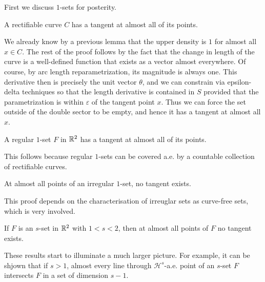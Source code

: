 \documentclass{memoir}
\begin{document}
First we discuss \(1\)-sets for posterity.
\begin{prop}
	A rectifiable curve \(C\) has a tangent at almost all of its points.
\end{prop}
We already know by a previous lemma that the upper density is \(1\) for almost all \(x \in C\). The rest of the proof follows by the fact that the change in length of the curve is a well-defined function that exists as a vector almost everywhere. Of course, by arc length reparametrization, its magnitude is always one. This derivative then is precisely the unit vector \(\theta \), and we can constrain via epsilon-delta techniques so that the length derivative is contained in \(S\) provided that the parametrization is within \(\varepsilon\) of the tangent point \(x\). Thus we can force the set outside of the double sector to be empty, and hence it has a tangent at almost all \(x\). %

\begin{prop}
	A regular \(1\)-set \(F\) in \(\mathbb{R}^2\) has a tangent at almost all of its points.
\end{prop}
This follows because regular \(1\)-sets can be covered a.e. by a countable collection of rectifiable curves.

 \begin{prop}
	At almost all points of an irregular \(1\)-set, no tangent exists.
\end{prop}
This proof depends on the characterisation of irreuglar sets as curve-free sets, which is very involved.

\begin{prop}
	If \(F\) is an \(s\)-set in \(\mathbb{R}^2\) with \(1<s<2\), then at almost all points of \(F\) no tangent exists.
\end{prop}

These results start to illuminate a much larger picture. For example, it can be shjown that if \(s>1\), almost every line through \(\mathcal{H}^{s}\)-a.e. point of an \(s\)-set \(F\) intersects \(F\) in a set of dimension \(s-1\).
\end{document}
